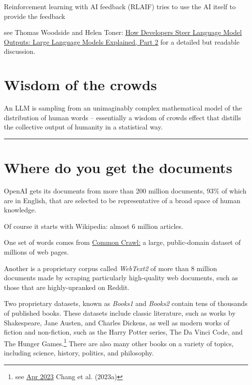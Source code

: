 \documentclass[
  Letterpaper,
]{scrbook}
\begin{document}
Reinforcement learning with AI feedback (RLAIF) tries to use the AI
itself to provide the feedback

see Thomas Woodside and Helen Toner:
\href{https://cset.georgetown.edu/article/how-developers-steer-language-model-outputs-large-language-models-explained-part-2/}{How
Developers Steer Language Model Outputs: Large Language Models
Explained, Part 2} for a detailed but readable discussion.

\section{Wisdom of the crowds}\label{wisdom-of-the-crowds}

An LLM is sampling from an unimaginably complex mathematical model of
the distribution of human words -- essentially a wisdom of crowds effect
that distills the collective output of humanity in a statistical way.

\begin{center}\rule{0.5\linewidth}{0.5pt}\end{center}

\section{Where do you get the
documents}\label{where-do-you-get-the-documents}

OpenAI gets its documents from more than 200 million documents, 93\% of
which are in English, that are selected to be representative of a broad
space of human knowledge.

Of course it starts with Wikipedia: almost 6 million articles.

One set of words comes from \href{https://commoncrawl.org/}{Common
Crawl:} a large, public-domain dataset of millions of web pages.

Another is a proprietary corpus called \emph{WebText2} of more than 8
million documents made by scraping particularly high-quality web
documents, such as those that are highly-upranked on Reddit.

Two proprietary datasets, known as \emph{Books1} and \emph{Books2}
contain tens of thousands of published books. These datasets include
classic literature, such as works by Shakespeare, Jane Austen, and
Charles Dickens, as well as modern works of fiction and non-fiction,
such as the Harry Potter series, The Da Vinci Code, and The Hunger
Games.\footnote{see \href{https://arxiv.org/pdf/2305.00118.pdf}{Apr
  2023} Chang et al. (2023a)} There are also many other books on a
variety of topics, including science, history, politics, and philosophy.
\end{document}
